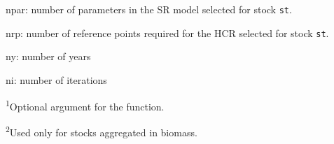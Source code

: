 \begin{landscape}
\begin{table}[!ht]
\begin{footnotesize}
\begin{threeparttable}
\begin{tabular}{lllll}
        \hline
      \end{tabular}

      \begin{tablenotes}
        \item npar: number of parameters in the SR model selected for stock \texttt{st}.
        \item nrp: number of reference points required for the HCR selected for stock \texttt{st}.
        \item ny: number of years
        \item ni: number of iterations
        \item \textsuperscript{1}Optional argument for the function.
        \item \textsuperscript{2}Used only for stocks aggregated in biomass.
      \end{tablenotes}

    \end{threeparttable}
  \end{footnotesize}

\end{table}        



\end{landscape}

